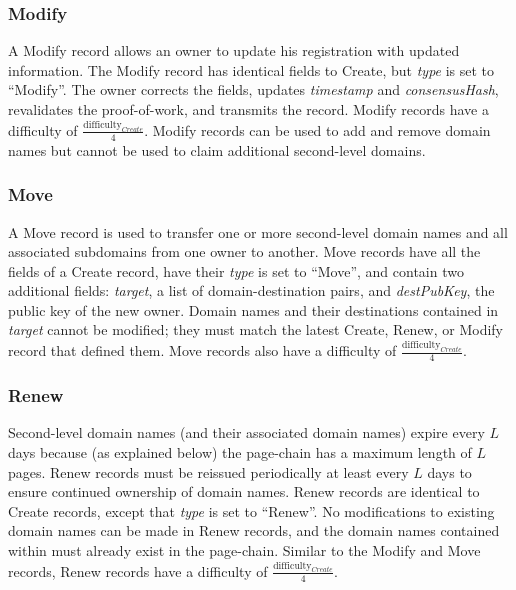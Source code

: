 
\subsubsection{Modify}

A Modify record allows an owner to update his registration with updated information. The Modify record has identical fields to Create, but \emph{type} is set to ``Modify''. The owner corrects the fields, updates \emph{timestamp} and \emph{consensusHash}, revalidates the proof-of-work, and transmits the record. Modify records have a difficulty of $ \frac{\textrm{difficulty}_{Create}}{4} $. Modify records can be used to add and remove domain names but cannot be used to claim additional second-level domains.

\subsubsection{Move}


A Move record is used to transfer one or more second-level domain names and all associated subdomains from one owner to another. Move records have all the fields of a Create record, have their \emph{type} is set to ``Move'', and contain two additional fields: \emph{target}, a list of domain-destination pairs, and \emph{destPubKey}, the public key of the new owner. Domain names and their destinations contained in \emph{target} cannot be modified; they must match the latest Create, Renew, or Modify record that defined them. Move records also have a difficulty of $ \frac{\textrm{difficulty}_{Create}}{4} $.

\subsubsection{Renew}


Second-level domain names (and their associated domain names) expire every $ L $ days because (as explained below) the page-chain has a maximum length of $ L $ pages. Renew records must be reissued periodically at least every $ L $ days to ensure continued ownership of domain names. Renew records are identical to Create records, except that \emph{type} is set to ``Renew''. No modifications to existing domain names can be made in Renew records, and the domain names contained within must already exist in the page-chain. Similar to the Modify and Move records, Renew records have a difficulty of $ \frac{\textrm{difficulty}_{Create}}{4} $.

